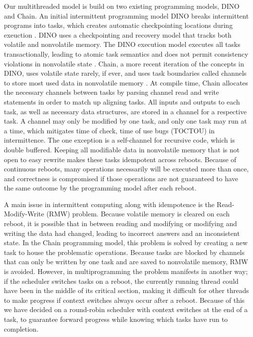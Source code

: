\documentclass[11pt]{sensys-proc}
\begin{document}
Our multithreaded model is build on two existing programming models, DINO and
Chain.  An initial intermittent programming model DINO breaks intermittent
programs into tasks, which creates automatic checkpointing locations during
exeuction \cite{Dino}. DINO uses a checkpointing and recovery model that tracks
both volatile and nonvolatile memory.  The DINO execution model executes all
tasks transactionally, leading to atomic task semantics and does not permit
consistency violations in nonvolatile state \cite{Dino}. Chain, a more recent
iteration of the concepts in DINO, uses volatile state rarely, if ever, and uses
task boundaries called channels to store most used data in nonvolatile memory
\cite{Chain}. At compile time, Chain allocates the necessary channels between
tasks by parsing channel read and write statements in order to match up aligning
tasks. All inputs and outputs to each task, as well as necessary data
structures, are stored in a channel for a respective task. A channel may only be
modified by one task, and only one task may run at a time, which mitigates time
of check, time of use bugs (TOCTOU) in intermittence.  The one exception is a
self-channel for recursive code, which is double buffered.  Keeping all
modifiable data in nonvolatile memory that is not open to easy rewrite makes
these tasks idempotent across reboots.  Because of continuous reboots, many
operations necessarily will be executed more than once, and correctness is
compromised if those operations are not guaranteed to have the same outcome by
the programming model after each reboot.

A main issue in intermittent computing along with idempotence is the
Read-Modify-Write (RMW) problem.  Because volatile memory is cleared on each
reboot, it is possible that in between reading and modifying or modifying and
writing the data had changed, leading to incorrect answers and an inconsistent
state. In the Chain programming model, this problem is solved by creating a new
task to house the problematic operations. Because tasks are blocked by channels
that can only be written by one task and are saved to nonvolatile memory, RMW is
avoided.  However, in multiprogramming the problem manifests in another way; if
the scheduler switches tasks on a reboot, the currently running thread could
have been in the middle of its critical section, making it difficult for other
threads to make progress if context switches always occur after a reboot.
Because of this we have decided on a round-robin scheduler with context switches
at the end of a task, to guarantee forward progress while knowing which tasks
have run to completion.
\end{document}
